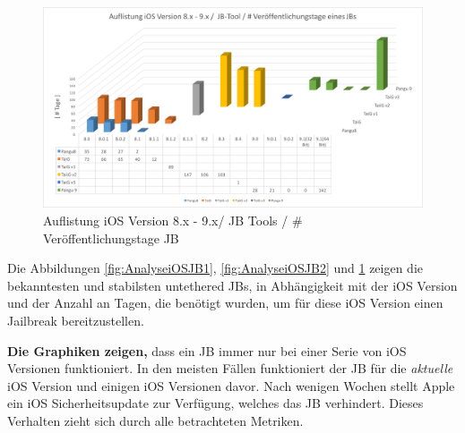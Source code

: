 \begin{figure}[htbp!]
        \centering
                \includegraphics[scale=0.5]{Bilder/Frage1_3.png}
        \caption{Auflistung iOS Version 8.x - 9.x/ JB Tools / \newline \# Veröffentlichungstage JB \protect\footnotemark}
        \label{fig:AnalyseiOSJB3}
\end{figure}
Die Abbildungen \ref{fig:AnalyseiOSJB1}, \ref{fig:AnalyseiOSJB2} und \ref{fig:AnalyseiOSJB3} zeigen die bekanntesten und stabilsten untethered JBs, in Abhängigkeit mit der iOS Version und der Anzahl an Tagen, die benötigt wurden, um für diese iOS Version einen Jailbreak bereitzustellen. \par 
\textbf{Die Graphiken zeigen,} dass ein JB immer nur bei einer Serie von iOS Versionen funktioniert. In den meisten Fällen funktioniert der JB für die \textit{\glqq aktuelle\grqq{}} iOS Version und einigen iOS Versionen davor. Nach wenigen Wochen stellt Apple ein iOS Sicherheitsupdate zur Verfügung, welches das JB verhindert. Dieses Verhalten zieht sich durch alle betrachteten Metriken.  
%

